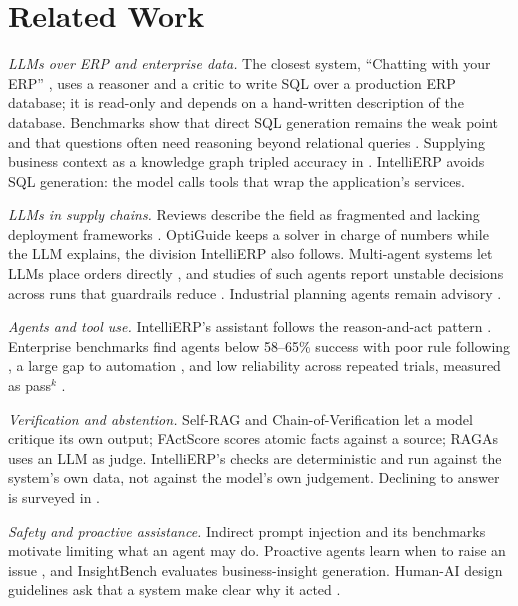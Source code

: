 \documentclass[conference]{IEEEtran}
\begin{document}
\section{Related Work}

\textit{LLMs over ERP and enterprise data.} The closest system, ``Chatting with your ERP''
\cite{ruizgomez2025erp}, uses a reasoner and a critic to write SQL over a production ERP database; it is
read-only and depends on a hand-written description of the database. Benchmarks show that direct SQL
generation remains the weak point \cite{lei2025spider2,li2023bird} and that questions often need reasoning
beyond relational queries \cite{biswal2025tag}. Supplying business context as a knowledge graph tripled
accuracy in \cite{sequeda2023kg}. IntelliERP avoids SQL generation: the model calls tools that wrap the
application's services.

\textit{LLMs in supply chains.} Reviews describe the field as fragmented and lacking deployment frameworks
\cite{song2026scm}. OptiGuide \cite{li2023optiguide} keeps a solver in charge of numbers while the LLM
explains, the division IntelliERP also follows. Multi-agent systems let LLMs place orders directly
\cite{quan2024invagent,yoshizato2026agents}, and studies of such agents report unstable decisions across runs
that guardrails reduce \cite{long2026reliability}. Industrial planning agents remain advisory
\cite{qi2025planning}.

\textit{Agents and tool use.} IntelliERP's assistant follows the reason-and-act pattern
\cite{yao2023react,schick2023toolformer}. Enterprise benchmarks find agents below 58--65\% success with poor
rule following \cite{huang2025crmarena}, a large gap to automation \cite{drouin2024workarena}, and low
reliability across repeated trials, measured as pass$^k$ \cite{yao2024taubench}.

\textit{Verification and abstention.} Self-RAG \cite{asai2024selfrag} and Chain-of-Verification
\cite{dhuliawala2024cove} let a model critique its own output; FActScore \cite{min2023factscore} scores
atomic facts against a source; RAGAs \cite{es2024ragas} uses an LLM as judge. IntelliERP's checks are
deterministic and run against the system's own data, not against the model's own judgement. Declining to
answer is surveyed in \cite{wen2025abstention}.

\textit{Safety and proactive assistance.} Indirect prompt injection \cite{greshake2023injection} and its
benchmarks \cite{debenedetti2024agentdojo} motivate limiting what an agent may do. Proactive agents learn
when to raise an issue \cite{lu2025proactive}, and InsightBench \cite{sahu2025insightbench} evaluates
business-insight generation. Human-AI design guidelines ask that a system make clear why it acted
\cite{amershi2019guidelines}.
\end{document}
